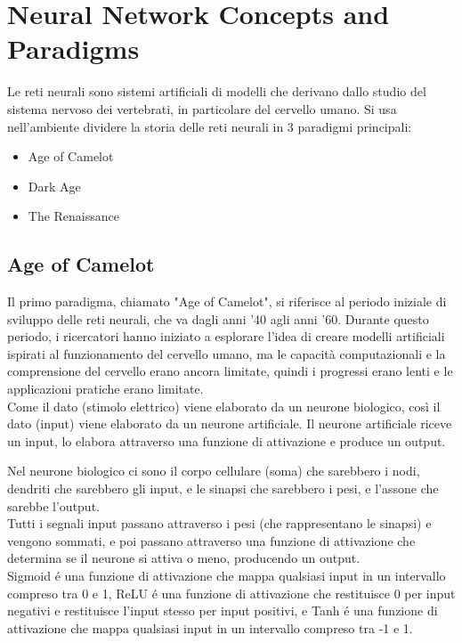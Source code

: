 \section{Neural Network Concepts and Paradigms}
Le reti neurali sono sistemi artificiali di modelli che derivano dallo studio del sistema nervoso dei 
vertebrati, in particolare del cervello umano.
Si usa nell'ambiente dividere la storia delle reti neurali in 3 paradigmi principali:
\begin{itemize}
    \item Age of Camelot
    \item Dark Age
    \item The Renaissance
\end{itemize}

\subsection{Age of Camelot}
Il primo paradigma, chiamato "Age of Camelot", si riferisce al periodo iniziale di sviluppo delle reti neurali,
che va dagli anni '40 agli anni '60. Durante questo periodo, i ricercatori hanno iniziato a esplorare l'idea di
creare modelli artificiali ispirati al funzionamento del cervello umano, ma le capacità computazionali e la 
comprensione del cervello erano ancora limitate, quindi i progressi erano lenti e le applicazioni pratiche erano limitate.\\

Come il dato (stimolo elettrico) viene elaborato da un neurone biologico, così il dato (input) viene elaborato da un neurone artificiale.
Il neurone artificiale riceve un input, lo elabora attraverso una funzione di attivazione e produce un output.

Nel neurone biologico ci sono il corpo cellulare (soma) che sarebbero i nodi, dendriti che sarebbero gli input, 
e le sinapsi che sarebbero i pesi, e l'assone che sarebbe l'output.\\

Tutti i segnali input passano attraverso i pesi (che rappresentano le sinapsi) e vengono sommati, e poi passano
attraverso una funzione di attivazione che determina se il neurone si attiva o meno, producendo un output.\\

Sigmoid é una funzione di attivazione che mappa qualsiasi input in un intervallo compreso tra 0 e 1,
ReLU é una funzione di attivazione che restituisce 0 per input negativi e restituisce l'input stesso per input positivi,
e Tanh é una funzione di attivazione che mappa qualsiasi input in un intervallo compreso tra -1 e 1.\\

